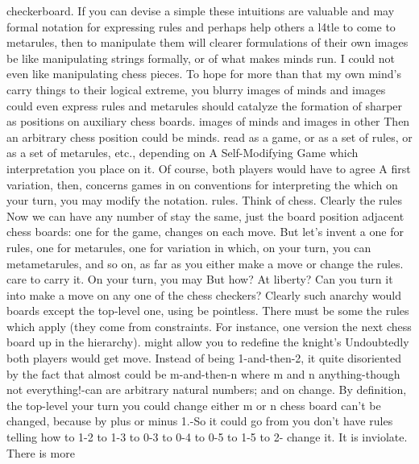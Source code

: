                                                checkerboard. If you can devise a simple
these intuitions are valuable and may          formal notation for expressing rules and
perhaps help others a l4tle to come to         metarules, then to manipulate them will
clearer formulations of their own images       be like manipulating strings formally, or
of what makes minds run. I could not           even like manipulating chess pieces. To
hope for more than that my own mind's          carry things to their logical extreme, you
blurry images of minds and images              could even express rules and metarules
should catalyze the formation of sharper       as positions on auxiliary chess boards.
images of minds and images in other            Then an arbitrary chess position could be
minds.                                         read as a game, or as a set of rules, or as
                                               a set of metarules, etc., depending on
      A Self-Modifying Game                    which interpretation you place on it. Of
                                               course, both players would have to agree
A first variation, then, concerns games in     on conventions for interpreting the
which on your turn, you may modify the         notation.
rules. Think of chess. Clearly the rules               Now we can have any number of
stay the same, just the board position         adjacent chess boards: one for the game,
changes on each move. But let's invent a       one for rules, one for metarules, one for
variation in which, on your turn, you can      metametarules, and so on, as far as you
either make a move or change the rules.        care to carry it. On your turn, you may
But how? At liberty? Can you turn it into      make a move on any one of the chess
checkers? Clearly such anarchy would           boards except the top-level one, using
be pointless. There must be some               the rules which apply (they come from
constraints. For instance, one version         the next chess board up in the hierarchy).
might allow you to redefine the knight's       Undoubtedly both players would get
move. Instead of being 1-and-then-2, it        quite disoriented by the fact that almost
could be m-and-then-n where m and n            anything-though not everything!-can
are arbitrary natural numbers; and on          change. By definition, the top-level
your turn you could change either m or n       chess board can't be changed, because
by plus or minus 1.-So it could go from        you don't have rules telling how to
1-2 to 1-3 to 0-3 to 0-4 to 0-5 to 1-5 to 2-   change it. It is inviolate. There is more
